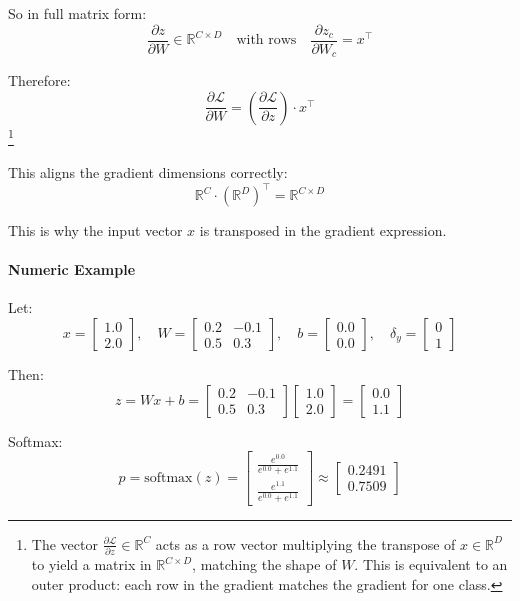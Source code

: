 So in full matrix form:
\[
\frac{\partial z}{\partial W} \in \mathbb{R}^{C \times D} \quad \text{with rows} \quad \frac{\partial z_c}{\partial W_c} = x^\top
\]

Therefore:
\[
\frac{\partial \mathcal{L}}{\partial W} = \left( \frac{\partial \mathcal{L}}{\partial z} \right) \cdot x^\top
\]
\footnote{The vector $\frac{\partial \mathcal{L}}{\partial z} \in \mathbb{R}^C$ acts as a row vector multiplying the transpose of $x \in \mathbb{R}^D$ to yield a matrix in $\mathbb{R}^{C \times D}$, matching the shape of $W$. This is equivalent to an outer product: each row in the gradient matches the gradient for one class.}

This aligns the gradient dimensions correctly:
\[
\mathbb{R}^C \cdot (\mathbb{R}^D)^\top = \mathbb{R}^{C \times D}
\]

This is why the input vector \( x \) is transposed in the gradient expression.

\paragraph{Numeric Example}

Let:
\[
x = \begin{bmatrix} 1.0 \\ 2.0 \end{bmatrix}, \quad
W = \begin{bmatrix} 0.2 & -0.1 \\ 0.5 & 0.3 \end{bmatrix}, \quad
b = \begin{bmatrix} 0.0 \\ 0.0 \end{bmatrix}, \quad
\delta_y = \begin{bmatrix} 0 \\ 1 \end{bmatrix}
\]

Then:
\[
z = Wx + b =
\begin{bmatrix} 0.2 & -0.1 \\ 0.5 & 0.3 \end{bmatrix}
\begin{bmatrix} 1.0 \\ 2.0 \end{bmatrix}
=
\begin{bmatrix} 0.0 \\ 1.1 \end{bmatrix}
\]

Softmax:
\[
p = \text{softmax}(z) =
\begin{bmatrix}
	\frac{e^{0.0}}{e^{0.0} + e^{1.1}} \\
	\frac{e^{1.1}}{e^{0.0} + e^{1.1}}
\end{bmatrix}
\approx
\begin{bmatrix} 0.2491 \\ 0.7509 \end{bmatrix}
\]

